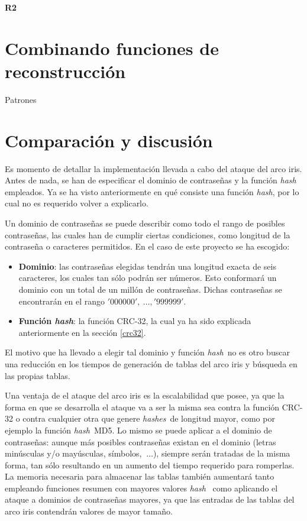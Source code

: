 \documentclass[12pt,spanish,listoffigures,listoftables]{tfgetsinf}
\newcommand{\hash}{\textit{hash}}
\newcommand{\hashes}{\textit{hashes}}
\begin{document}
\textbf{R2}

\section{Combinando funciones de reconstrucción}

Patrones

\section{Comparación y discusión}


Es momento de detallar la implementación llevada a cabo del ataque del arco iris. Antes de nada, se han de especificar el dominio de contraseñas y la función \hash~ empleados. Ya se ha visto anteriormente en qué consiste una función \hash, por lo cual no es requerido volver a explicarlo.

Un dominio de contraseñas se puede describir como todo el rango de posibles contraseñas, las cuales han de cumplir ciertas condiciones, como longitud de la contraseña o caracteres permitidos. En el caso de este proyecto se ha escogido:

\begin{itemize}

    \item \textbf{Dominio}: las contraseñas elegidas tendrán una longitud exacta de seis caracteres, los cuales tan sólo podrán ser números. Esto conformará un dominio con un total de un millón de contraseñas. Dichas contraseñas se encontrarán en el rango $'000000',~\dots, '999999'$.
    
    \item \textbf{Función \hash}: la función CRC-32, la cual ya ha sido explicada anteriormente en la sección \ref{crc32}.
    
\end{itemize}

El motivo que ha llevado a elegir tal dominio y función \hash~no es otro buscar una reducción en los tiempos de generación de tablas del arco iris y búsqueda en las propias tablas.

Una ventaja de el ataque del arco iris es la escalabilidad que posee, ya que la forma en que se desarrolla el ataque va a ser la misma sea contra la función CRC-32 o contra cualquier otra que genere \hashes~de longitud mayor, como por ejemplo la función \hash~MD5. Lo mismo se puede aplicar a el dominio de contraseñas: aunque más posibles contraseñas existan en el dominio (letras minúsculas y/o mayúsculas, símbolos, $~\dots$), siempre serán tratadas de la misma forma, tan sólo resultando en un aumento del tiempo requerido para romperlas. La memoria necesaria para almacenar las tablas también aumentará tanto empleando funciones resumen con mayores valores \hash~ como aplicando el ataque a dominios de contraseñas mayores, ya que las entradas de las tablas del arco iris contendrán valores de mayor tamaño.
\end{document}
